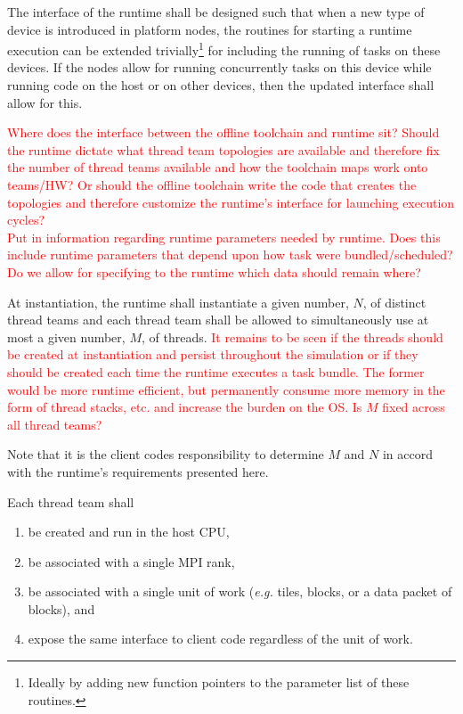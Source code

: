 \documentclass{article}
\begin{document}
\begin{req}
The interface of the runtime shall be designed such  that when a new type of
device is introduced in platform nodes, the routines for starting a runtime
execution can be extended trivially\footnote{Ideally by adding new function
pointers to the parameter list of these routines.} for including the running of
tasks on these devices.  If the nodes allow for running concurrently tasks on
this device while running code on the host or on other devices, then the updated
interface shall allow for this.
\end{req}

\textcolor{red}{Where does the interface between the offline toolchain and
runtime sit?  Should the runtime dictate what thread team topologies are
available and therefore fix the number of thread teams available and how the
toolchain maps work onto teams/HW?  Or should the offline toolchain write the
code that creates the topologies and therefore customize the runtime's interface
for launching execution cycles?}\\

\textcolor{red}{Put in information regarding runtime parameters needed by
runtime.  Does this include runtime parameters that depend upon how task were
bundled/scheduled?}\\

\textcolor{red}{Do we allow for specifying to the runtime which data should
remain where?}\\

\begin{req}
At instantiation, the runtime shall instantiate a given number, $N$, of distinct
thread teams and each thread team shall be allowed to simultaneously use
at most a given number, $M$, of threads.  \textcolor{red}{It remains to be seen
if the threads should be created at instantiation and persist throughout the
simulation or if they should be created each time the runtime executes a task
bundle.  The former would be more runtime efficient, but permanently consume
more memory in the form of thread stacks, etc. and increase the burden on the
OS.  Is $M$ fixed across all thread teams?}
\end{req}

Note that it is the client codes responsibility to determine $M$ and $N$ in
accord with the runtime's requirements presented here.

\begin{req}
Each thread team shall
\begin{enumerate}
\item{be created and run in the host CPU,}
\item{be associated with a single MPI rank,}
\item{be associated with a single unit of work (\textit{e.g.} tiles, blocks, or a
data packet of blocks), and}
\item{expose the same interface to client code regardless of the unit of work.}
\end{enumerate}
\end{req}
\end{document}
